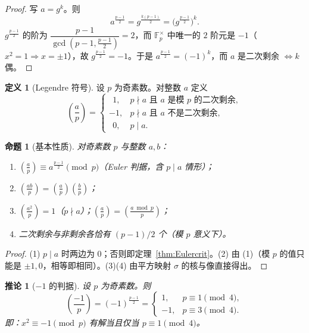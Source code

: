 \documentclass[a4paper,11pt]{ctexart}
\numberwithin{equation}{section}
\theoremstyle{plain}
\newtheorem{proposition}[theorem]{命题}
\newtheorem{corollary}[theorem]{推论}
\theoremstyle{definition}
\newtheorem{definition}[theorem]{定义}
\theoremstyle{remark}
\newcommand{\F}{\mathbb{F}}
\newcommand{\leg}[2]{\left(\frac{#1}{#2}\right)}
\begin{document}
\begin{proof}
写 $a=g^k$。则
\[
a^{\frac{p-1}{2}}=g^{\frac{k(p-1)}2}=\bigl(g^{\frac{p-1}{2}}\bigr)^{k}.
\]
$g^{\frac{p-1}{2}}$ 的阶为 $\dfrac{p-1}{\gcd(p-1,\frac{p-1}2)}=2$，而 $\F_p^{\times}$ 中唯一的 $2$ 阶元是 $-1$（$x^2=1\Rightarrow x=\pm1$），故 $g^{\frac{p-1}2}=-1$。于是 $a^{\frac{p-1}2}=(-1)^k$，而 $a$ 是二次剩余 $\iff k$ 偶。
\end{proof}

\begin{definition}[Legendre 符号]\label{def:Legendre}
设 $p$ 为奇素数。对整数 $a$ 定义
\[
\leg{a}{p}=\begin{cases}
\ \ 1, & p\nmid a \text{ 且 } a \text{ 是模 } p \text{ 的二次剩余},\\
-1, & p\nmid a \text{ 且 } a \text{ 不是二次剩余},\\
\ \ 0, & p\mid a.
\end{cases}
\]
\end{definition}

\begin{proposition}[基本性质]\label{prop:legprop}
对奇素数 $p$ 与整数 $a,b$：
\begin{enumerate}[itemsep=0.1em]
  \item $\leg{a}{p}\equiv a^{\frac{p-1}{2}}\pmod p$（Euler 判据，含 $p\mid a$ 情形）；
  \item $\leg{ab}{p}=\leg{a}{p}\leg{b}{p}$；
  \item $\leg{a^2}{p}=1$（$p\nmid a$）；$\leg{a}{p}=\leg{a \bmod p}{p}$；
  \item 二次剩余与非剩余各恰有 $(p-1)/2$ 个（模 $p$ 意义下）。
\end{enumerate}
\end{proposition}

\begin{proof}
(1) $p\mid a$ 时两边为 $0$；否则即定理~\ref{thm:Eulercrit}。(2) 由 (1)（模 $p$ 的值只能是 $\pm1,0$，相等即相同）。(3)(4) 由平方映射 $\sigma$ 的核与像直接得出。
\end{proof}

\begin{corollary}[$-1$ 的判据]\label{cor:negone}
设 $p$ 为奇素数。则
\[
\leg{-1}{p}=(-1)^{\frac{p-1}{2}}
=\begin{cases}1,& p\equiv1\pmod4,\\ -1,& p\equiv3\pmod4.\end{cases}
\]
即：$x^2\equiv-1\pmod p$ 有解当且仅当 $p\equiv 1 \pmod 4$。
\end{corollary}
\end{document}
